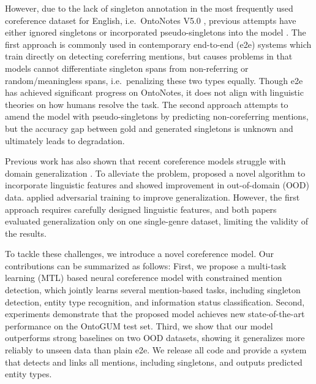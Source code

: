 \documentclass[11pt]{article}
\begin{document}
However, due to the lack of singleton annotation in the most frequently used coreference dataset for English, i.e.~OntoNotes V5.0 \citep{weischedel-handbook-2011-notes,pradhan-etal-2013-towards}, previous attempts have either ignored singletons \citep{lee-etal-2017-end, lee-etal-2018-higher, wu-etal-2020-corefqa, dobrovolskii-2021-word} or incorporated pseudo-singletons into the model \citep{wu-gardner-2021-understanding, toshniwal-etal-2021-generalization}.
The first approach is commonly used in contemporary end-to-end (e2e) systems which train directly on detecting coreferring mentions, but causes problems in that models cannot differentiate singleton spans from non-referring or random/meaningless spans, i.e.~penalizing these two types equally. 
Though e2e has achieved significant progress on OntoNotes, it does not align with linguistic theories on how humans resolve the task. The second approach attempts to amend the model with pseudo-singletons by predicting non-coreferring mentions, but the accuracy gap between gold and generated singletons is unknown and ultimately leads to degradation.



Previous work has also shown that recent coreference models struggle with domain generalization \citep{moosavi-strube-2017-lexical, zhu-etal-2021-ontogum}. To alleviate the problem, \citet{moosavi-strube-2018-using} proposed a novel algorithm to incorporate linguistic features and showed improvement in out-of-domain (OOD) data. \citet{subramanian-roth-2019-improving} applied adversarial
training to improve generalization. However, the first approach requires carefully designed linguistic features, and both papers evaluated generalization only on one single-genre dataset, limiting the validity of the results.

To tackle these challenges, we introduce a novel coreference model. Our contributions can be summarized as follows: First, we propose 
a multi-task learning (MTL) based neural coreference model with constrained mention detection, which jointly learns several mention-based tasks, including singleton detection, entity type recognition, and information status classification. Second, experiments demonstrate that the proposed model achieves new state-of-the-art performance on the OntoGUM test set. Third, we show that our model outperforms strong baselines on two OOD datasets, showing it generalizes more reliably to unseen data than plain e2e. We release all code and provide a system that detects and links all mentions, including singletons, and outputs predicted entity types. 
\end{document}
